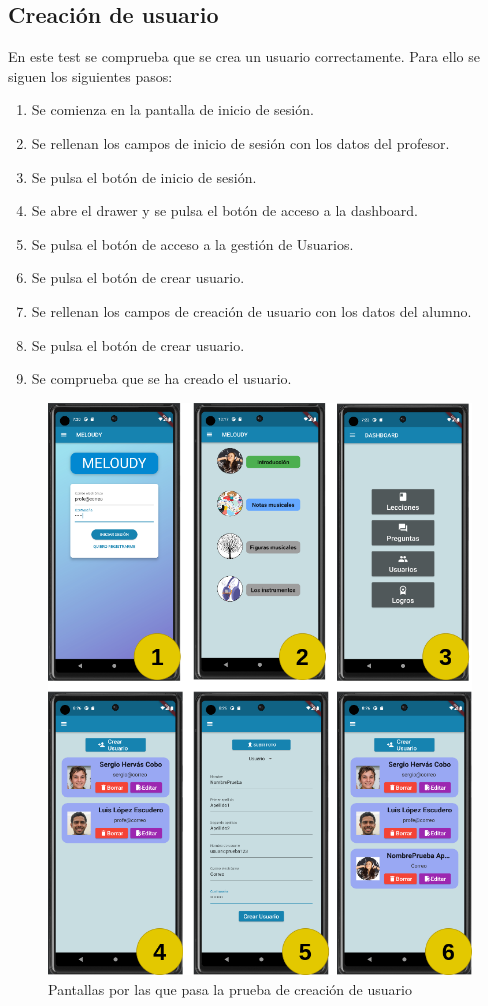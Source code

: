 \subsection{Creación de usuario}
En este test se comprueba que se crea un usuario correctamente. Para ello se siguen los siguientes pasos:
\begin{enumerate}
    \item Se comienza en la pantalla de inicio de sesión.
    \item Se rellenan los campos de inicio de sesión con los datos del profesor.
    \item Se pulsa el botón de inicio de sesión.
    \item Se abre el drawer y se pulsa el botón de acceso a la dashboard.
    \item Se pulsa el botón de acceso a la gestión de Usuarios.
    \item Se pulsa el botón de crear usuario.
    \item Se rellenan los campos de creación de usuario con los datos del alumno.
    \item Se pulsa el botón de crear usuario.
    \item Se comprueba que se ha creado el usuario.
\end{enumerate}

\begin{figure}[H]
    \centering
    \includegraphics[width=\textwidth]{imagenes/c8/testint1.png}
    \caption{Pantallas por las que pasa la prueba de creación de usuario}
    \label{fig:prueba_creacion_usuario}
\end{figure}

